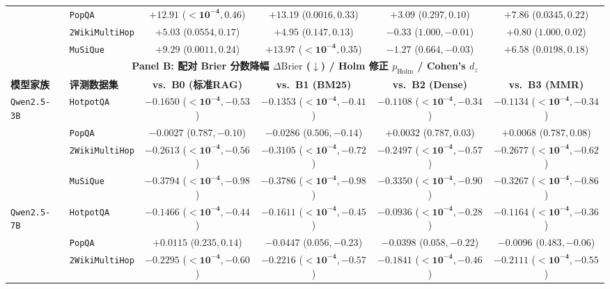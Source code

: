 \documentclass[11pt]{article}
\begin{document}
\begin{table}[t]
{\begin{tabular}{llcccc}
& \texttt{PopQA} & $\mathbf{+12.91}$ ($\mathbf{<10^{-4}}, 0.46$) & $\mathbf{+13.19}$ ($\mathbf{0.0016}, 0.33$) & $+3.09$ ($0.297, 0.10$) & $\mathbf{+7.86}$ ($\mathbf{0.0345}, 0.22$) \\
& \texttt{2WikiMultiHop} & $+5.03$ ($0.0554, 0.17$) & $+4.95$ ($0.147, 0.13$) & $-0.33$ ($1.000, -0.01$) & $+0.80$ ($1.000, 0.02$) \\
& \texttt{MuSiQue} & $\mathbf{+9.29}$ ($\mathbf{0.0011}, 0.24$) & $\mathbf{+13.97}$ ($\mathbf{<10^{-4}}, 0.35$) & $-1.27$ ($0.664, -0.03$) & $\mathbf{+6.58}$ ($\mathbf{0.0198}, 0.18$) \\
\midrule
\midrule
\multicolumn{6}{c}{\textbf{Panel B: 配对 Brier 分数降幅 $\Delta\text{Brier}$ ($\downarrow$) / Holm 修正 $p_{\text{Holm}}$ / Cohen's $d_z$}} \\
\midrule
\textbf{模型家族} & \textbf{评测数据集} & \textbf{vs.\ B0 (标准RAG)} & \textbf{vs.\ B1 (BM25)} & \textbf{vs.\ B2 (Dense)} & \textbf{vs.\ B3 (MMR)} \\
\midrule
\multirow{4}{*}{\texttt{Qwen2.5-3B}}
& \texttt{HotpotQA} & $\mathbf{-0.1650}$ ($\mathbf{<10^{-4}}, -0.53$) & $\mathbf{-0.1353}$ ($\mathbf{<10^{-4}}, -0.41$) & $\mathbf{-0.1108}$ ($\mathbf{<10^{-4}}, -0.34$) & $\mathbf{-0.1134}$ ($\mathbf{<10^{-4}}, -0.34$) \\
& \texttt{PopQA} & $-0.0027$ ($0.787, -0.10$) & $-0.0286$ ($0.506, -0.14$) & $+0.0032$ ($0.787, 0.03$) & $+0.0068$ ($0.787, 0.08$) \\
& \texttt{2WikiMultiHop} & $\mathbf{-0.2613}$ ($\mathbf{<10^{-4}}, -0.56$) & $\mathbf{-0.3105}$ ($\mathbf{<10^{-4}}, -0.72$) & $\mathbf{-0.2497}$ ($\mathbf{<10^{-4}}, -0.57$) & $\mathbf{-0.2677}$ ($\mathbf{<10^{-4}}, -0.62$) \\
& \texttt{MuSiQue} & $\mathbf{-0.3794}$ ($\mathbf{<10^{-4}}, -0.98$) & $\mathbf{-0.3786}$ ($\mathbf{<10^{-4}}, -0.98$) & $\mathbf{-0.3350}$ ($\mathbf{<10^{-4}}, -0.90$) & $\mathbf{-0.3267}$ ($\mathbf{<10^{-4}}, -0.86$) \\
\midrule
\multirow{4}{*}{\texttt{Qwen2.5-7B}}
& \texttt{HotpotQA} & $\mathbf{-0.1466}$ ($\mathbf{<10^{-4}}, -0.44$) & $\mathbf{-0.1611}$ ($\mathbf{<10^{-4}}, -0.45$) & $\mathbf{-0.0936}$ ($\mathbf{<10^{-4}}, -0.28$) & $\mathbf{-0.1164}$ ($\mathbf{<10^{-4}}, -0.36$) \\
& \texttt{PopQA} & $+0.0115$ ($0.235, 0.14$) & $-0.0447$ ($0.056, -0.23$) & $-0.0398$ ($0.058, -0.22$) & $-0.0096$ ($0.483, -0.06$) \\
& \texttt{2WikiMultiHop} & $\mathbf{-0.2295}$ ($\mathbf{<10^{-4}}, -0.60$) & $\mathbf{-0.2216}$ ($\mathbf{<10^{-4}}, -0.57$) & $\mathbf{-0.1841}$ ($\mathbf{<10^{-4}}, -0.46$) & $\mathbf{-0.2111}$ ($\mathbf{<10^{-4}}, -0.55$) \\

\end{tabular}}
\end{table}
\end{document}
